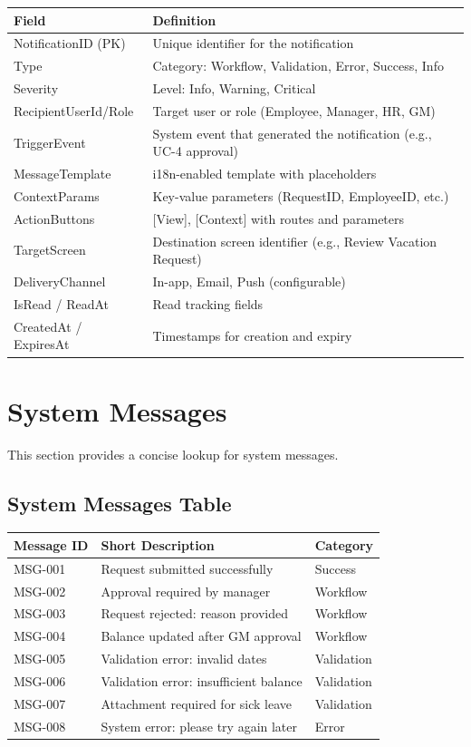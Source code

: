 \documentclass[12pt,a4paper]{article}
\begin{document}
\begin{longtable}{p{4cm} p{11cm}}
\toprule
\textbf{Field} & \textbf{Definition} \\
\midrule
NotificationID (PK) & Unique identifier for the notification \\
Type & Category: Workflow, Validation, Error, Success, Info \\
Severity & Level: Info, Warning, Critical \\
RecipientUserId/Role & Target user or role (Employee, Manager, HR, GM) \\
TriggerEvent & System event that generated the notification (e.g., UC-4 approval) \\
MessageTemplate & i18n-enabled template with placeholders \\
ContextParams & Key-value parameters (RequestID, EmployeeID, etc.) \\
ActionButtons & [View], [Context] with routes and parameters \\
TargetScreen & Destination screen identifier (e.g., Review Vacation Request) \\
DeliveryChannel & In-app, Email, Push (configurable) \\
IsRead / ReadAt & Read tracking fields \\
CreatedAt / ExpiresAt & Timestamps for creation and expiry \\
\bottomrule
\end{longtable}

\section{System Messages}

This section provides a concise lookup for system messages.

\subsection{System Messages Table}
\begin{longtable}{p{3cm} p{8cm} p{3cm}}
\toprule
\textbf{Message ID} & \textbf{Short Description} & \textbf{Category} \\
\midrule
MSG-001 & Request submitted successfully & Success \\
MSG-002 & Approval required by manager & Workflow \\
MSG-003 & Request rejected: reason provided & Workflow \\
MSG-004 & Balance updated after GM approval & Workflow \\
MSG-005 & Validation error: invalid dates & Validation \\
MSG-006 & Validation error: insufficient balance & Validation \\
MSG-007 & Attachment required for sick leave & Validation \\
MSG-008 & System error: please try again later & Error \\
\bottomrule
\end{longtable}
\end{document}
